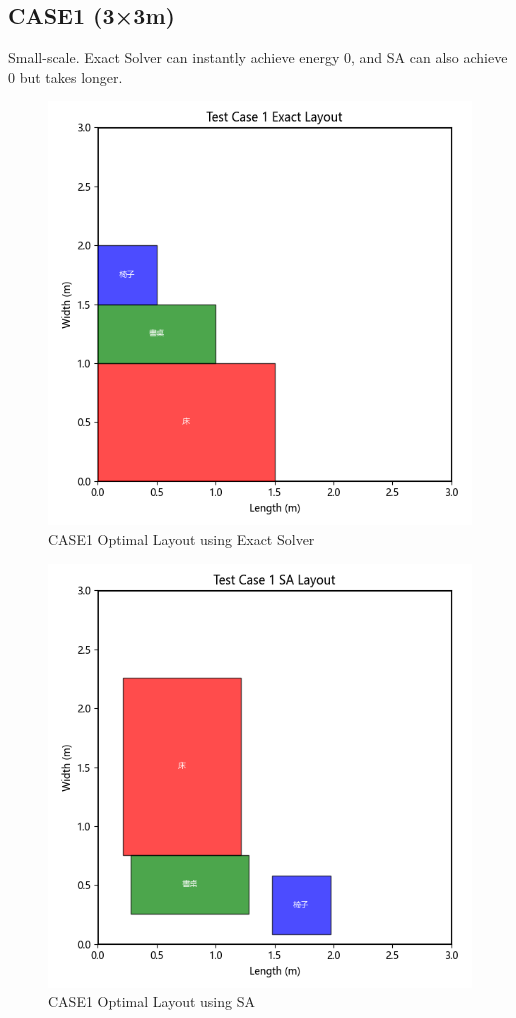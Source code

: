 \documentclass[conference]{IEEEtran}
\begin{document}
\subsection{CASE1 (3×3m)}
Small-scale. Exact Solver can instantly achieve energy 0, and SA can also achieve 0 but takes longer.

\begin{figure}[!htbp]
    \centering
    \includegraphics[width=0.8\columnwidth]{exact_layout_test_case_1.png} 
    \caption{CASE1 Optimal Layout using Exact Solver}
    \label{fig:case1_exact_solver}
\end{figure}

\begin{figure}[!htbp]
    \centering
    \includegraphics[width=0.8\columnwidth]{sa_layout_test_case_1.png} 
    \caption{CASE1 Optimal Layout using SA}
    \label{fig:case1_sa}
\end{figure}
\end{document}
